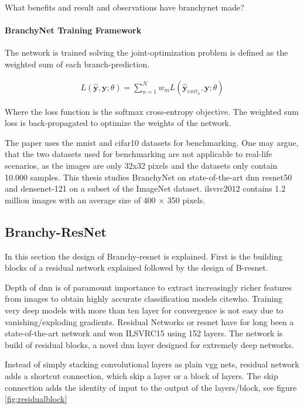 What benefits and result and observations have branchynet made? 

\paragraph{BranchyNet Training Framework}

The network is trained solving the joint-optimization problem is defined as the weighted sum of each branch-prediction.

\begin{align*}
L(\hat{\mathbf{y}},\mathbf{y};\theta) = \sum_{n=1}^{N} w_m L(\hat{\mathbf{y}}_{exit_n},\mathbf{y};\theta)
\end{align*}

Where the loss function is the softmax cross-entropy objective.
The weighted sum loss is back-propagated to optimize the weights of the network. 

The paper uses the \gls{mnist} and \gls{cifar10} datasets for benchmarking. One may argue, that the two datasets used for benchmarking are not applicable to real-life scenarios, as the images are only 32x32 pixels and the datasets only contain 10.000 samples. This thesis studies BranchyNet on state-of-the-art \gls{dnn} \gls{resnet}50 and \gls{densenet}-121 on a subset of the ImageNet dataset. \gls{ilsvrc2012} contains 1.2 million images with an average size of 400 $\times$ 350 pixels.
  

\subsection{Branchy-ResNet}

In this section the design of Branchy-\gls{resnet} is explained. First is the building blocks of a residual network explained followed by the design of B-\gls{resnet}. 

Depth of \gls{dnn} is of paramount importance to extract increasingly richer features from images to obtain highly accurate classification models cite{who}. Training very deep models with more than ten layer for convergence is not easy due to vanishing/exploding gradients. Residual Networks or \gls{resnet} \cite{he_deep_2015} have for long been a state-of-the-art network and won ILSVRC15 using 152 layers. The network is build of residual blocks, a novel \gls{dnn} layer designed for extremely deep networks. 

Instead of simply stacking convolutional layers as plain \gls{vgg} nets, residual network adds a shortcut connection, which skip a layer or a block of layers. The skip connection adds the identity of input to the output of the layers/block, see figure \ref{fig:residualblock}

